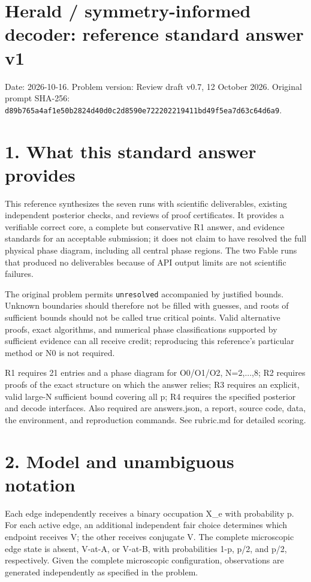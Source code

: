 \documentclass[11pt,a4paper]{article}
\begin{document}
\section*{Herald /\allowbreak{} symmetry-informed decoder: reference standard answer v1}

Date: 2026-10-16. Problem version: Review draft v0.7, 12 October 2026. Original prompt SHA-256: \nolinkurl{d89b765a4af1e50b2824d40d0c2d8590e722202219411bd49f5ea7d63c64d6a9}.

\section*{1. What this standard answer provides}

This reference synthesizes the seven runs with scientific deliverables, existing independent posterior checks, and reviews of proof certificates. It provides a verifiable correct core, a complete but conservative R1 answer, and evidence standards for an acceptable submission; it does not claim to have resolved the full physical phase diagram, including all central phase regions. The two Fable runs that produced no deliverables because of API output limits are not scientific failures.

The original problem permits \nolinkurl{unresolved} accompanied by justified bounds. Unknown boundaries should therefore not be filled with guesses, and roots of sufficient bounds should not be called true critical points. Valid alternative proofs, exact algorithms, and numerical phase classifications supported by sufficient evidence can all receive credit; reproducing this reference's particular method or N0 is not required.

R1 requires 21 entries and a phase diagram for O0/\allowbreak{}O1/\allowbreak{}O2, N=2,...,8; R2 requires proofs of the exact structure on which the answer relies; R3 requires an explicit, valid large-N sufficient bound covering all p; R4 requires the specified posterior and decode interfaces. Also required are answers.json, a report, source code, data, the environment, and reproduction commands. See rubric.md for detailed scoring.

\section*{2. Model and unambiguous notation}

Each edge independently receives a binary occupation X\_e with probability p. For each active edge, an additional independent fair choice determines which endpoint receives V; the other receives conjugate V. The complete microscopic edge state is absent, V-at-A, or V-at-B, with probabilities 1-p, p/\allowbreak{}2, and p/\allowbreak{}2, respectively. Given the complete microscopic configuration, observations are generated independently as specified in the problem.
\end{document}

